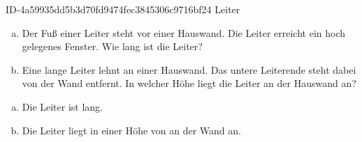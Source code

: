 \begin{exercise}
      {ID-4a59935dd5b3d70fd9474fec3845306c9716bf24}
      {Leiter}
  \ifproblem\problem
    \begin{enumerate}[a)]
      \item Der Fuß einer Leiter steht  vor einer Hauswand. Die Leiter
            erreicht ein  hoch gelegenes Fenster. Wie lang ist die Leiter?
      \item Eine  lange Leiter lehnt an einer Hauswand. Das untere
            Leiterende steht dabei  von der Wand entfernt. In welcher
            Höhe liegt die Leiter an der Hauswand an?
    \end{enumerate}
  \fi
  \ifoutcome\outcome
    \begin{enumerate}[a)]
      \item Die Leiter ist  lang.
      \item Die Leiter liegt in einer Höhe von  an der Wand an.
    \end{enumerate}
  \fi
\end{exercise}
